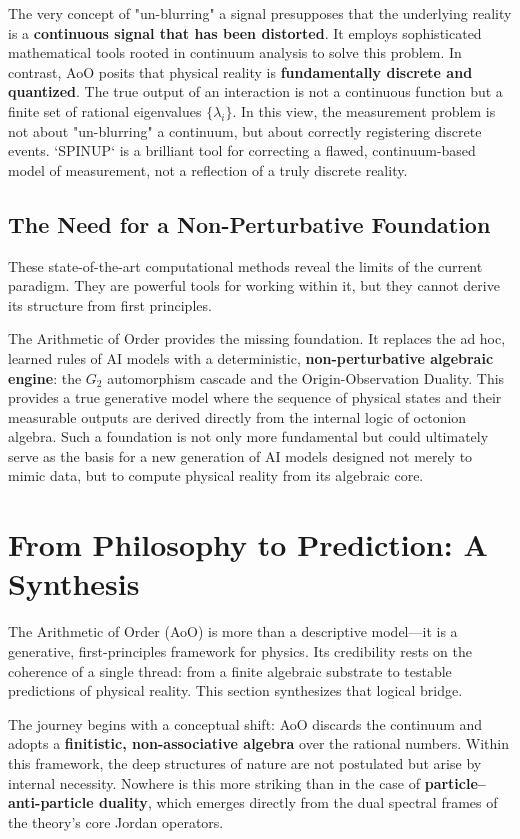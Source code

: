 \documentclass[11pt, a4paper]{article}
\theoremstyle{definition}
\theoremstyle{remark}
\begin{document}
The very concept of "un-blurring" a signal presupposes that the underlying reality is a \textbf{continuous signal that has been distorted}. It employs sophisticated mathematical tools rooted in continuum analysis to solve this problem. In contrast, AoO posits that physical reality is \textbf{fundamentally discrete and quantized}. The true output of an interaction is not a continuous function but a finite set of rational eigenvalues $\{\lambda_i\}$. In this view, the measurement problem is not about "un-blurring" a continuum, but about correctly registering discrete events. `SPINUP` is a brilliant tool for correcting a flawed, continuum-based model of measurement, not a reflection of a truly discrete reality.

\subsection{The Need for a Non-Perturbative Foundation}
These state-of-the-art computational methods reveal the limits of the current paradigm. They are powerful tools for working within it, but they cannot derive its structure from first principles.

The Arithmetic of Order provides the missing foundation. It replaces the ad hoc, learned rules of AI models with a deterministic, \textbf{non-perturbative algebraic engine}: the $G_2$ automorphism cascade and the Origin-Observation Duality. This provides a true generative model where the sequence of physical states and their measurable outputs are derived directly from the internal logic of octonion algebra. Such a foundation is not only more fundamental but could ultimately serve as the basis for a new generation of AI models designed not merely to mimic data, but to compute physical reality from its algebraic core.

\section{From Philosophy to Prediction: A Synthesis}

The Arithmetic of Order (AoO) is more than a descriptive model—it is a generative, first-principles framework for physics. Its credibility rests on the coherence of a single thread: from a finite algebraic substrate to testable predictions of physical reality. This section synthesizes that logical bridge.

The journey begins with a conceptual shift: AoO discards the continuum and adopts a \textbf{finitistic, non-associative algebra} over the rational numbers. Within this framework, the deep structures of nature are not postulated but arise by internal necessity. Nowhere is this more striking than in the case of \textbf{particle–anti-particle duality}, which emerges directly from the dual spectral frames of the theory’s core Jordan operators. 
\end{document}

